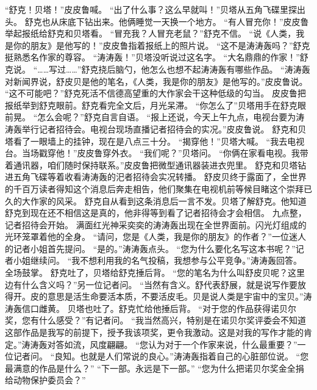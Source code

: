 \documentclass[a4paper,12pt,UTF8,twoside]{ctexbook}
\begin{document}
        “舒克！贝塔！”皮皮鲁喊。 
        “出了什么事？这么早就叫！”贝塔从五角飞碟里探出头。 
        舒克也从床底下钻出来。他俩睡觉一天换一个地方。 
        “有人冒充你！”皮皮鲁举起报纸给舒克和贝塔看。 
        “冒充我？人冒充老鼠？”舒克不信。 
        “说《人类，我是你的朋友》是他写的！”皮皮鲁指着报纸上的照片说。 
        “这不是涛涛轰吗？”舒克挺熟悉名作家的尊容。 
        “涛涛轰！”贝塔没听说过这名字。 
        “大名鼎鼎的作家！”舒克说。 
        “……写过……”舒克挠后脑勺，他怎么也想不起涛涛轰有哪些作品。 
        “涛涛轰对新闻界说，舒皮贝是他的笔名，《人类，我是你的朋友》是他写的。”皮皮鲁说。 
        “这不可能吧？”舒克死活不信德高望重的大作家会干这种低级的勾当。 
        皮皮鲁把报纸举到舒克眼前。舒克看完全文后，月光呆滞。 
        “你怎么了”贝塔用手在舒克眼前晃。 
        “怎么会呢？”舒克自言自语。 
        “报上还说，今天上午九点，电视台要为涛涛轰举行记者招待会。电视台现场直播记者招待会的实况。”皮皮鲁说。 
        舒克和贝塔看了一眼墙上的挂钟，现在是八点三十分。 
        “揭穿他！”贝塔大喊。 
        “我去电视台。当场戳穿他！”皮皮鲁穿外衣。 
        “我们呢？”贝塔问。 
        “你俩在家看电视。我带着通讯器，咱们随时保持联系。”皮皮鲁把微型通讯器装进衣兜里。 
        舒克和贝塔钻进五角飞碟等着收看涛涛轰的汜者招待会实况转播。 
        舒皮贝终于露面了，全世界的千百万读者得知这个消息后奔走相告，他们聚集在电视机前等候目睹这个崇拜已久的大作家的风采。 
        舒克自从看到这条消息后一言不发。贝塔了解舒克。他知道舒克到现在还不相信这是真的，他非得等到看了记者招待会才会相信。 
        九点整，记者招待会开始。 
        满面红光神采奕奕的涛涛轰出现在全世界面前。闪光灯组成的光环笼罩着他的全身。 
        “请问，您是《人类，我是你的朋友》的作者？”一位迷人的记者小姐首先提问。 
        “是的。”涛涛轰点头。 
        “您为什么要化名写这本书呢？”记者小姐继续问。 
        “我不想利用我的名气投稿，我想参与公平竞争。”涛涛轰回答。 
        全场鼓掌。 
        舒克吐了，贝塔给舒克捶后背。 
        “您的笔名为什么叫舒皮贝呢？这里边有什么含义吗？”另一位记者问。 
        “当然有含义。舒代表舒展，就是说写作要放得开。皮的意思是活生命要活本质，不要活皮毛。贝是说人类是宇宙中的宝贝。”涛涛轰信口雌黄。 
        贝塔也吐了。舒克忙给他捶后背。 
        “对于您的作品获得诺贝尔奖，您有什么感受？”有记者问。 
        “我当然高兴，特别是在诺贝尔奖评委会不知道这部作品是我写的前提下，授予我该项奖，更令我激动。这是对我的写作才能的肯定。”涛涛轰对答如流，风度翩翩。 
        “您认为对于一个作家来说，什么最重要？”一位记者问。 
        “良知。也就是人们常说的良心。”涛涛轰指着自己的心脏部位说。 
        “您最满意的作品是什么？” 
        “下一部。永远是下一部。” 
        “您为什么把诺贝尔奖金全捐给动物保护委员会？” 
\end{document}
